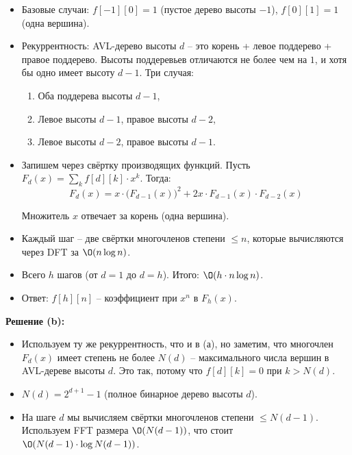 \begin{enumerate}
\begin{itemize}
      \item Базовые случаи: $f[-1][0] = 1$ (пустое дерево высоты $-1$), $f[0][1] = 1$ (одна вершина).

      \item Рекуррентность: AVL-дерево высоты $d$ -- это корень + левое поддерево + правое поддерево. Высоты поддеревьев отличаются не более чем на $1$, и хотя бы одно имеет высоту $d - 1$. Три случая:
      \begin{enumerate}
        \item Оба поддерева высоты $d - 1$,
        \item Левое высоты $d - 1$, правое высоты $d - 2$,
        \item Левое высоты $d - 2$, правое высоты $d - 1$.
      \end{enumerate}

      \item Запишем через свёртку производящих функций. Пусть $F_d(x) = \sum_k f[d][k] \cdot x^k$. Тогда:
      $$F_d(x) = x \cdot \big(F_{d-1}(x)\big)^2 + 2x \cdot F_{d-1}(x) \cdot F_{d-2}(x)$$

      Множитель $x$ отвечает за корень (одна вершина).

      \item Каждый шаг -- две свёртки многочленов степени $\leq n$, которые вычисляются через DFT за $\O(n \log n)$.

      \item Всего $h$ шагов (от $d = 1$ до $d = h$). Итого: $\O(h \cdot n \log n)$.

      \item Ответ: $f[h][n]$ -- коэффициент при $x^n$ в $F_h(x)$.
    \end{itemize}

    \textbf{Решение (b):}

    \begin{itemize}
      \item Используем ту же рекуррентность, что и в (а), но заметим, что многочлен $F_d(x)$ имеет степень не более $N(d)$ -- максимального числа вершин в AVL-дереве высоты $d$. Это так, потому что $f[d][k] = 0$ при $k > N(d)$.

      \item $N(d) = 2^{d+1} - 1$ (полное бинарное дерево высоты $d$).

      \item На шаге $d$ мы вычисляем свёртки многочленов степени $\leq N(d-1)$. Используем FFT размера $\O(N(d-1))$, что стоит $\O(N(d-1) \cdot \log N(d-1))$.


\end{itemize}
\end{enumerate}
